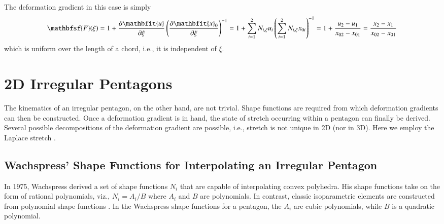 The deformation gradient in this case is simply
\begin{equation}
    \mathbfsf{F} ( \xi ) = 1 + \frac{\partial \mathbfit{u}}{\partial \xi} 
    \left( \frac{\partial \mathbfit{x}_0 }{\partial \xi} \right)^{-1} = 
    1 + \sum_{i=1}^2 N_{i,\xi} u_i \left( \sum_{i=1}^2 N_{i,\xi} x_{0i} \right)^{-1} = 
    1 + \frac{u_2 - u_1}{x_{02} - x_{01}} = \frac{x_2 - x_1}{x_{02} - x_{01}}
\end{equation}
which is uniform over the length of a chord, i.e., it is independent of $\xi$.

\section{2D Irregular Pentagons}

The kinematics of an irregular pentagon, on the other hand, are not trivial.  Shape functions are required from which deformation gradients can then be constructed.  Once a deformation gradient is in hand, the state of stretch occurring within a pentagon can finally be derived.  Several possible decompositions of the deformation gradient are possible, i.e., stretch is not unique in 2D (nor in 3D).  Here we employ the Laplace stretch \cite{Freedetal19}.

\subsection{Wachspress' Shape Functions for Interpolating an Irregular Pentagon}
\label{secShapeFns}

In 1975, Wachspress \cite{Wachspress75,Wachspress16} derived a set of shape functions $N_i$ that are capable of interpolating convex polyhedra.  His shape functions take on the form of rational polynomials, viz., $N_i = A_i / B$ where $A_i$ and $B$ are polynomials.  In contrast, classic isoparametric elements are constructed from polynomial shape functions \cite{Hughes87}.  In the Wachspress shape functions for a pentagon, the $A_i$ are cubic polynomials, while $B$ is a quadratic polynomial.

